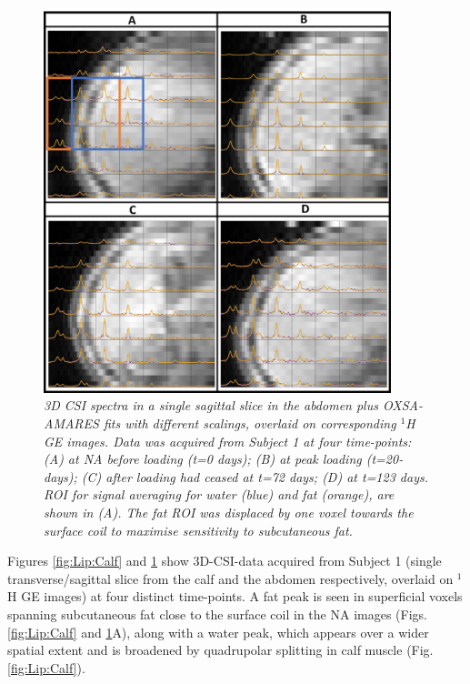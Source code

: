 \begin{figure}
    \centering
    \includegraphics[width=0.9\textwidth]{Figures/Lipid/Abdomen.png}
    \caption{\textit{3D \ac{CSI} spectra in a single sagittal slice in the abdomen plus OXSA-AMARES fits with different scalings, overlaid on corresponding $^1$H \ac{GE} images. Data was acquired from Subject 1 at four time-points: (A) at NA before loading (t=0 days); (B) at peak loading (t=20-days); (C) after loading had ceased at t=72 days; (D) at t=123 days. \ac{ROI} for signal averaging for water (blue) and fat (orange), are shown in (A). The fat \ac{ROI} was displaced by one voxel towards the surface coil to maximise sensitivity to subcutaneous fat.}}
    \label{fig:Lip:Abdomen}
\end{figure}

Figures \ref{fig:Lip:Calf} and \ref{fig:Lip:Abdomen} show 3D-\ac{CSI}-data acquired from Subject 1 (single transverse/sagittal slice from the calf and the abdomen respectively, overlaid on $^1$H GE images) at four distinct time-points. A fat peak is seen in superficial voxels spanning subcutaneous fat close to the surface coil in the \ac{NA} images (Figs. \ref{fig:Lip:Calf} and \ref{fig:Lip:Abdomen}A), along with a water peak, which appears over a wider spatial extent and is broadened by quadrupolar splitting in calf muscle (Fig. \ref{fig:Lip:Calf}). 

